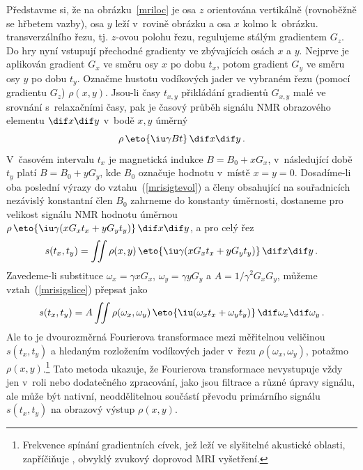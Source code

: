 Představme si, že na obrázku~\ref{mriloc} je osa $z$ orientována vertikálně
(rovnoběžně se hřbetem vazby), osa $y$ leží v~rovině obrázku a osa $x$ kolmo
k~obrázku.  transverzálního řezu, tj. $z$-ovou polohu řezu,
regulujeme stálým gradientem $G_{z}$. Do hry nyní vstupují přechodné gradienty
ve zbývajících osách $x$ a $y$. Nejprve je aplikován gradient $G_{x}$ ve směru
osy $x$ po dobu $t_{x}$, potom gradient $G_{y}$ ve směru osy $y$ po dobu
$t_{y}$. Označme hustotu vodíkových jader ve vybraném řezu (pomocí gradientu
$G_{z}$) $\rho(x,y)$. Jsou-li časy $t_{x,y}$ přikládání gradientů $G_{x,y}$
malé ve srovnání s~relaxačními časy, pak je časový průběh signálu NMR
obrazového elementu $\dif x\dif y$ v~bodě $x,y$ úměrný
\begin{equation}
  \rho\,\eto{\iu\gamma Bt}\,\dif x\dif y\,.            \label{mrisigtevol}
\end{equation}
V~časovém intervalu $t_{x}$ je magnetická indukce $B=B_{0}+xG_{x}$,
v~následující době $t_{y}$ platí $B=B_{0}+yG_{y}$, kde $B_{0}$ označuje
hodnotu v~místě $x=y=0$. Dosadíme-li oba poslední výrazy do
vztahu~(\ref{mrisigtevol}) a členy obsahující na souřadnicích nezávislý
konstantní člen $B_{0}$ zahrneme do konstanty úměrnosti, dostaneme pro
velikost signálu NMR hodnotu úměrnou $\rho\,\eto{\iu\gamma
  (xG_{x}t_{x}+yG_{y}t_{y})}\,\dif x\dif y$, a pro celý řez
\begin{equation}
  s(t_{x},t_{y})
    = \iint\rho(x,y)\,\eto{\iu\gamma (xG_{x}t_{x}+yG_{y}t_{y})}\,
    \dif x\dif y\,.                                     \label{mrisigslice}
\end{equation}
Zavedeme-li substituce $\omega_{x}=\gamma xG_{x}$, $\omega_{y}=\gamma yG_{y}$
a $A=1/\gamma^{2}G_{x}G_{y}$, můžeme vztah~(\ref{mrisigslice}) přepsat jako
\begin{equation}
  s(t_{x},t_{y})
    = A\iint\rho(\omega_{x},\omega_{y})\,
    \eto{\iu(\omega_{x}t_{x}+\omega_{y}t_{y})}\,
    \dif\omega_{x}\dif\omega_{y}\,.                           \label{mrift}
\end{equation}
Ale to je dvourozměrná Fourierova transformace mezi měřitelnou veličinou
$s(t_{x},t_{y})$ a hledaným rozložením vodíkových jader v~řezu
$\rho(\omega_{x},\omega_{y})$, potažmo $\rho(x,y)$.\footnote{Frekvence spínání
  gradientních cívek, jež leží ve slyšitelné akustické oblasti, zapříčiňuje
  , obvyklý zvukový doprovod MRI vyšetření.} Tato metoda
ukazuje, že Fourierova transformace nevystupuje vždy jen v~roli 
nebo dodatečného zpracování, jako jsou filtrace a různé úpravy signálu, ale
může být nativní, neoddělitelnou součástí převodu primárního signálu
$s(t_{x},t_{y})$ na obrazový výstup $\rho(x,y)$.

